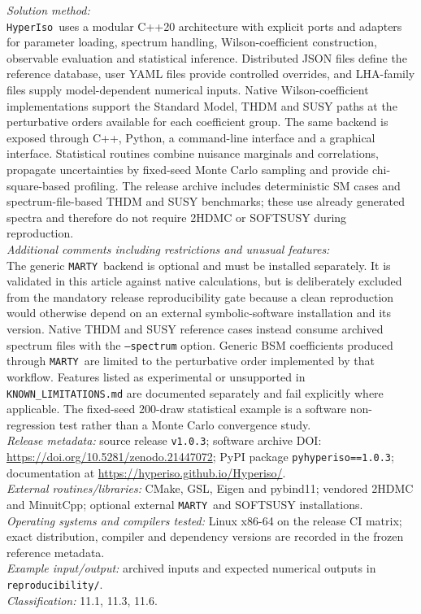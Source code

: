 \documentclass[preprint,11pt]{elsarticle}
\newcommand{\hi}{\texttt{HyperIso}}
\newcommand{\mty}{\texttt{MARTY}}
\begin{document}
\begin{small}
{\em Solution method:}\\
\hi~uses a modular C++20 architecture with explicit ports and adapters for parameter loading, spectrum handling, Wilson-coefficient construction, observable evaluation and statistical inference. Distributed JSON files define the reference database, user YAML files provide controlled overrides, and LHA-family files supply model-dependent numerical inputs. Native Wilson-coefficient implementations support the Standard Model, THDM and SUSY paths at the perturbative orders available for each coefficient group. The same backend is exposed through C++, Python, a command-line interface and a graphical interface. Statistical routines combine nuisance marginals and correlations, propagate uncertainties by fixed-seed Monte Carlo sampling and provide chi-square-based profiling. The release archive includes deterministic SM cases and spectrum-file-based THDM and SUSY benchmarks; these use already generated spectra and therefore do not require 2HDMC or SOFTSUSY during reproduction. \\
{\em Additional comments including restrictions and unusual features:}\\
The generic \mty~backend is optional and must be installed separately. It is validated in this article against native calculations, but is deliberately excluded from the mandatory release reproducibility gate because a clean reproduction would otherwise depend on an external symbolic-software installation and its version. Native THDM and SUSY reference cases instead consume archived spectrum files with the \texttt{--spectrum} option. Generic BSM coefficients produced through \mty~are limited to the perturbative order implemented by that workflow. Features listed as experimental or unsupported in \texttt{KNOWN\_LIMITATIONS.md} are documented separately and fail explicitly where applicable. The fixed-seed 200-draw statistical example is a software non-regression test rather than a Monte Carlo convergence study. \\
{\em Release metadata:} source release \texttt{v1.0.3}; software archive DOI: \url{https://doi.org/10.5281/zenodo.21447072}; PyPI package \texttt{pyhyperiso==1.0.3}; documentation at \url{https://hyperiso.github.io/Hyperiso/}. \\
{\em External routines/libraries:} CMake, GSL, Eigen and pybind11; vendored 2HDMC and MinuitCpp; optional external \mty~and SOFTSUSY installations. \\
{\em Operating systems and compilers tested:} Linux x86-64 on the release CI matrix; exact distribution, compiler and dependency versions are recorded in the frozen reference metadata. \\
{\em Example input/output:} archived inputs and expected numerical outputs in \texttt{reproducibility/}. \\
{\em Classification:} 11.1, 11.3, 11.6.
\end{small}
\end{document}
